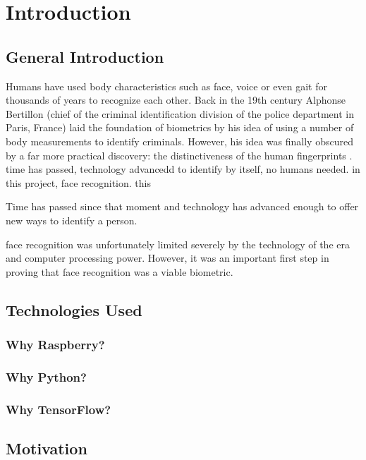 \chapter{Introduction}
\label{introduction}

\section{General Introduction}
Humans have used body characteristics such as face, voice or even gait for thousands of years to recognize each other. Back in the 19th century Alphonse Bertillon (chief of the criminal identification division of the police department in Paris, France) laid the foundation of biometrics by his idea of using a number of body measurements to identify criminals. However, his idea was finally obscured by a far more practical discovery: the distinctiveness of the human fingerprints \cite{jain_biometrics}. 
time has passed, technology advancedd to identify by itself, no humans needed. in this project, face recognition. this 


Time has passed since that moment and technology has advanced enough to offer new ways to identify a person. 


face recognition was unfortunately limited severely by the technology of the era and computer processing power. However, it was an important first step in proving that face recognition was a viable biometric.

\section{Technologies Used}	%
	\subsection{Why Raspberry?}
	\subsection{Why Python?}
	\subsection{Why TensorFlow?}
\section{Motivation}
